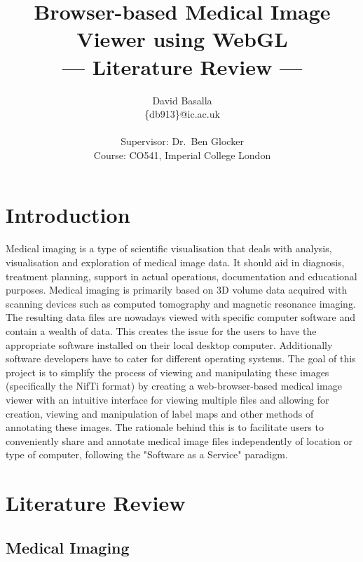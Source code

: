 \documentclass[a4paper,11pt,titlepage]{article}
\title{Browser-based Medical Image Viewer using WebGL \\\Large{--- Literature Review ---}}
\author{David Basalla\\
       \{db913\}@ic.ac.uk\\ \\
       \small{Supervisor: Dr.\ Ben Glocker}\\
       \small{Course: CO541, Imperial College London}
}
\begin{document}
\maketitle

\section{Introduction}
Medical imaging is a type of scientific visualisation that deals with analysis, visualisation and exploration of medical image data. It should aid in diagnosis, treatment planning, support in actual operations, documentation and educational purposes. Medical imaging is primarily based on 3D volume data acquired with scanning devices such as computed tomography and magnetic resonance imaging. The resulting data files are nowadays viewed with specific computer software and contain a wealth of data. This creates the issue for the users to have the appropriate software installed on their local desktop computer. Additionally software developers have to cater for different operating systems. The goal of this project is to simplify the process of viewing and manipulating these images (specifically the NifTi format) by creating a web-browser-based medical image viewer with an intuitive interface for viewing multiple files and allowing for creation, viewing and manipulation of label maps and other methods of annotating these images. The rationale behind this is to facilitate users to conveniently share and annotate medical image files independently of location or type of computer, following the "Software as a Service" paradigm.

\section{Literature Review}

\subsection{Medical Imaging}
\end{document}
